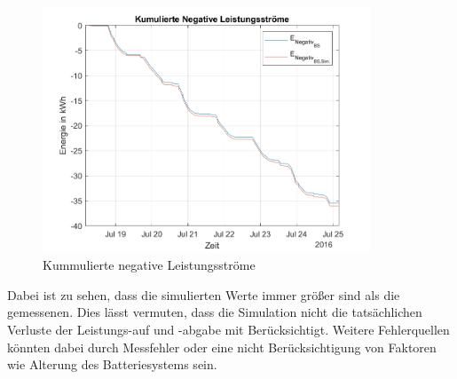 \begin{figure}[H]
    \centering
    \includegraphics[width=0.87\textwidth]{Abbildungen/plot6.png}
    \caption{Kummulierte negative Leistungsströme}
    \label{fig:plot1_230730_3}
\end{figure}
Dabei ist zu sehen, dass die simulierten Werte immer größer sind als die gemessenen. Dies lässt vermuten, dass die Simulation 
nicht die tatsächlichen Verluste der Leistungs-auf und -abgabe mit Berücksichtigt. Weitere Fehlerquellen könnten dabei durch Messfehler oder eine nicht Berücksichtigung von Faktoren wie Alterung des Batteriesystems sein.\\

